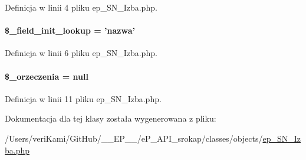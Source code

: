 Definicja w linii 4 pliku ep\-\_\-\-S\-N\-\_\-\-Izba.\-php.

\hypertarget{classep___s_n___izba_a4a4d54ae35428077a7c61ec8a5139af3}{
\paragraph[{\$\-\_\-field\-\_\-init\-\_\-lookup}]{\setlength{\rightskip}{0pt plus 5cm}\$\-\_\-field\-\_\-init\-\_\-lookup = 'nazwa'}}\label{classep___s_n___izba_a4a4d54ae35428077a7c61ec8a5139af3}


Definicja w linii 6 pliku ep\-\_\-\-S\-N\-\_\-\-Izba.\-php.

\hypertarget{classep___s_n___izba_aa013b5921d7a844cc79c7e3a5ffbd03a}{
\paragraph[{\$\-\_\-orzeczenia}]{\setlength{\rightskip}{0pt plus 5cm}\$\-\_\-orzeczenia = null\hspace{0.3cm}{\ttfamily [protected]}}}\label{classep___s_n___izba_aa013b5921d7a844cc79c7e3a5ffbd03a}


Definicja w linii 11 pliku ep\-\_\-\-S\-N\-\_\-\-Izba.\-php.



Dokumentacja dla tej klasy została wygenerowana z pliku\-:\begin{DoxyCompactItemize}
\item 
/\-Users/veri\-Kami/\-Git\-Hub/\-\_\-\-\_\-\-E\-P\-\_\-\-\_\-/e\-P\-\_\-\-A\-P\-I\-\_\-srokap/classes/objects/\hyperlink{ep___s_n___izba_8php}{ep\-\_\-\-S\-N\-\_\-\-Izba.\-php}\end{DoxyCompactItemize}
